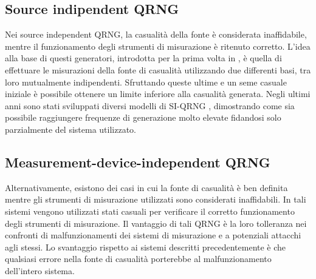 \subsection{Source indipendent QRNG}
Nei source independent QRNG, la casualità della fonte è considerata inaffidabile, mentre il funzionamento degli strumenti di misurazione è ritenuto corretto. 
L'idea alla base di questi generatori, introdotta per la prima volta in \cite{vallone_quantum_2014}, è quella di effettuare le misurazioni della fonte di casualità utilizzando due differenti basi, tra loro mutualmente indipendenti. Sfruttando queste ultime e un seme casuale iniziale è possibile ottenere un limite inferiore alla casualità generata. Negli ultimi anni sono stati sviluppati diversi modelli di SI-QRNG \cite{marangon_source-device-independent_2017, avesani_source-device-independent_2018}, dimostrando come sia possibile raggiungere frequenze di generazione molto elevate fidandosi solo parzialmente del sistema utilizzato.


\subsection{Measurement-device-independent QRNG}
Alternativamente, esistono dei casi in cui la fonte di casualità è ben definita mentre gli strumenti di misurazione utilizzati sono considerati inaffidabili. 
In tali sistemi vengono utilizzati stati casuali per verificare il corretto funzionamento degli strumenti di misurazione. Il vantaggio di tali QRNG è la loro tolleranza nei confronti di malfunzionamenti dei sistemi di misurazione e a potenziali attacchi agli stessi. Lo svantaggio rispetto ai sistemi descritti precedentemente è che qualsiasi errore nella fonte di casualità porterebbe al malfunzionamento dell'intero sistema. 